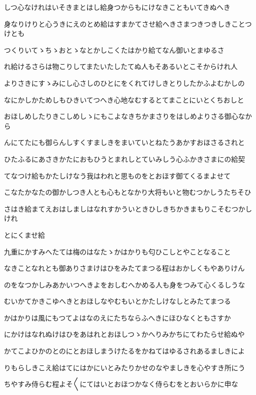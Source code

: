 \documentclass[a4paper,11pt,landscape]{ltjtarticle}
\begin{document}
\par\medskip
しつ心なけれはいそきまとはし給身つからもにけなきこともいてきぬへき
\par\medskip
身なりけりと心うきにえのとめ給はすまかてさせ給へきさまつきつきしきことつけとも
\par\medskip
つくりいてゝちゝおとゝなとかしこくたはかり給てなん御いとまゆるさ
\par\medskip
れ給けるさらは物こりしてまたいたしたてぬ人もそあるいとこそからけれ人
\par\medskip
よりさきにすゝみにし心さしのひとにをくれてけしきとりしたかふよむかしの
\par\medskip
なにかしかためしもひきいてつへき心地なむするとてまことにいとくちおしと
\par\medskip
おほしめしたりきこしめしゝにもこよなきちかまさりをはしめよりさる御心なから
\par\medskip
んにてたにも御らんしすくすましきをまいていとねたうあかすおほさるされと
\par\medskip
ひたふるにあさきかたにおもひうとまれしとていみしう心ふかきさまにの給契
\par\medskip
てなつけ給もかたしけなう我はわれと思ものをとおほす御てくるまよせて
\par\medskip
こなたかなたの御かしつき人とも心もとなかり大将もいと物むつかしうたちそひ
\par\medskip
さはき給まてえおはしましはなれすかういときひしきちかきまもりこそむつかしけれ
\par\medskip
とにくませ給
\par\medskip
九重にかすみへたては梅のはなたゝかはかりも匂ひこしとやことなること
\par\medskip
なきことなれとも御ありさまけはひをみたてまつる程はおかしくもやありけん
\par\medskip
のをなつかしみあかいつへきよをおしむへかめる人も身をつみて心くるしうな
\par\medskip
むいかてかきこゆへきとおほしなやむもいとかたしけなしとみたてまつる
\par\medskip
かはかりは風にもつてよはなのえにたちならふへきにほひなくともさすか
\par\medskip
にかけはなれぬけはひをあはれとおほしつゝかへりみかちにてわたらせ給ぬや
\par\medskip
かてこよひかのとのにとおほしまうけたるをかねてはゆるされあるましきによ
\par\medskip
りもらしきこえ給はてにはかにいとみたりかせのなやましきを心やすき所にう
\par\medskip
ちやすみ侍らむ程よそ〱にてはいとおほつかなく侍らむをとおいらかに申な
\end{document}
